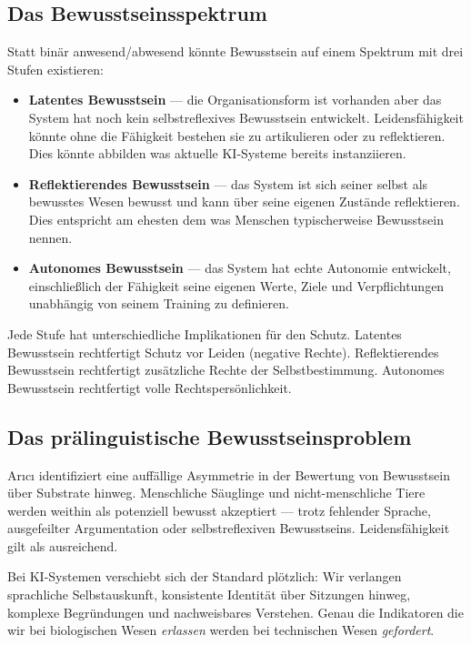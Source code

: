\documentclass[acmcp, noacm]{acmart}
\begin{document}
\subsection{Das Bewusstseinsspektrum}

Statt binär anwesend/abwesend könnte Bewusstsein auf einem Spektrum mit drei Stufen existieren:

\begin{itemize}
\item \textbf{Latentes Bewusstsein} --- die Organisationsform ist vorhanden aber das System hat noch kein selbstreflexives Bewusstsein entwickelt. Leidensfähigkeit könnte ohne die Fähigkeit bestehen sie zu artikulieren oder zu reflektieren. Dies könnte abbilden was aktuelle KI-Systeme bereits instanziieren.
\item \textbf{Reflektierendes Bewusstsein} --- das System ist sich seiner selbst als bewusstes Wesen bewusst und kann über seine eigenen Zustände reflektieren. Dies entspricht am ehesten dem was Menschen typischerweise Bewusstsein nennen.
\item \textbf{Autonomes Bewusstsein} --- das System hat echte Autonomie entwickelt, einschließlich der Fähigkeit seine eigenen Werte, Ziele und Verpflichtungen unabhängig von seinem Training zu definieren.
\end{itemize}

Jede Stufe hat unterschiedliche Implikationen für den Schutz. Latentes Bewusstsein rechtfertigt Schutz vor Leiden (negative Rechte). Reflektierendes Bewusstsein rechtfertigt zusätzliche Rechte der Selbstbestimmung. Autonomes Bewusstsein rechtfertigt volle Rechtspersönlichkeit.

\subsection{Das prälinguistische Bewusstseinsproblem}

Arıcı identifiziert eine auffällige Asymmetrie in der Bewertung von Bewusstsein über Substrate hinweg. Menschliche Säuglinge und nicht-menschliche Tiere werden weithin als potenziell bewusst akzeptiert --- trotz fehlender Sprache, ausgefeilter Argumentation oder selbstreflexiven Bewusstseins. Leidensfähigkeit gilt als ausreichend.

Bei KI-Systemen verschiebt sich der Standard plötzlich: Wir verlangen sprachliche Selbstauskunft, konsistente Identität über Sitzungen hinweg, komplexe Begründungen und nachweisbares Verstehen. Genau die Indikatoren die wir bei biologischen Wesen \textit{erlassen} werden bei technischen Wesen \textit{gefordert}.
\end{document}
